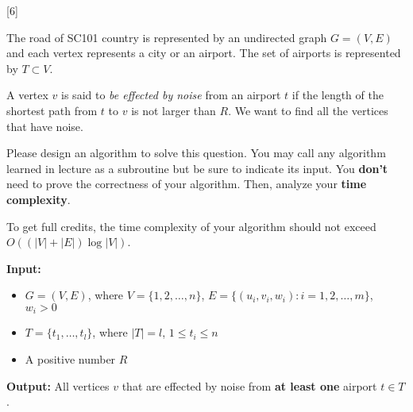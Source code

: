 [6]

The road of SC101 country is represented by an undirected graph $G = (V, E)$ and each vertex represents a city or an airport. The set of airports is represented by $T \subset V$. 

A vertex $v$ is said to \textit{be effected by noise} from an airport $t$ if the length of the shortest path from $t$ to $v$ is not larger than $R$. We want to find all the vertices that have noise.

Please design an algorithm to solve this question. You may call any algorithm learned in lecture as a subroutine but be sure to indicate its input. You \textbf{don't} need to prove the correctness of your algorithm. Then, analyze your \textbf{time complexity}.

To get full credits, the time complexity of your algorithm should not exceed $O\left(\left(|V| + |E|\right) \log |V|\right)$.

\textbf{Input:}
\begin{itemize}
    \item $G = (V, E)$, where $V=\{1,2,\ldots, n\}$, $E=\{(u_i,v_i,w_i):i=1,2,\ldots, m\}$, $w_i > 0$
    \item $T = \{t_1, \ldots, t_{l}\}$, where $|T| = l$, $1 \le t_i \le n$
    \item A positive number $R$
\end{itemize}

\textbf{Output:} All vertices $v$ that are effected by noise from \textbf{at least one} airport $t \in T$.


\begin{solution}

    \vspace{13cm}
    
\end{solution}




